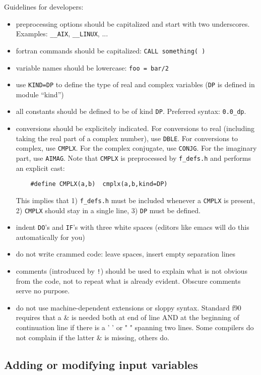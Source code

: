 \documentclass[12pt,a4paper]{article}
\begin{document}
Guidelines for developers:
\begin{itemize}
\item preprocessing options should be capitalized and start with two
underscores. Examples: \texttt{\_\_AIX}, \texttt{\_\_LINUX}, ...
\item fortran commands should be capitalized: \texttt{CALL something( )}
\item variable names should be lowercase: \texttt{foo = bar/2}
\item use \texttt{KIND=DP} to define the type of real and complex variables
(\texttt{DP} is defined in module ``kind'')
\item all constants should be defined to be of kind \texttt{DP}.
Preferred syntax: \texttt{0.0\_dp}.
\item conversions should be explicitely indicated. For conversions to real
(including taking the real part of a complex number), use \texttt{DBLE}.
For conversions to complex, use \texttt{CMPLX}. For the complex conjugate,
use \texttt{CONJG}. For the imaginary part, use \texttt{AIMAG}.
Note that \texttt{CMPLX} is preprocessed by \texttt{f\_defs.h} 
and performs an explicit cast:
\begin{verbatim}
    #define CMPLX(a,b)  cmplx(a,b,kind=DP)
\end{verbatim}
This implies that 1) \texttt{f\_defs.h} must be included whenever a
\texttt{CMPLX} is present, 2) \texttt{CMPLX} should stay in a single line, 
3) \texttt{DP} must be defined.
\item indent \texttt{DO}'s and  \texttt{IF}'s with three white spaces
(editors like emacs will do this automatically for you)
\item do not write crammed code: leave spaces, insert empty separation
lines
\item comments (introduced by \texttt{!}) should be used to explain 
what is not obvious from the code, not to repeat what is already 
evident. Obscure comments serve no purpose.
\item do not use machine-dependent extensions or sloppy syntax.
Standard f90 requires that a \& is needed both at end of line 
AND at the beginning of continuation line if there is a ' ' 
or " " spanning two lines. Some compilers do not complain
if the latter \& is missing, others do.
\end{itemize}

\subsection{Adding or modifying input variables}
\end{document}
